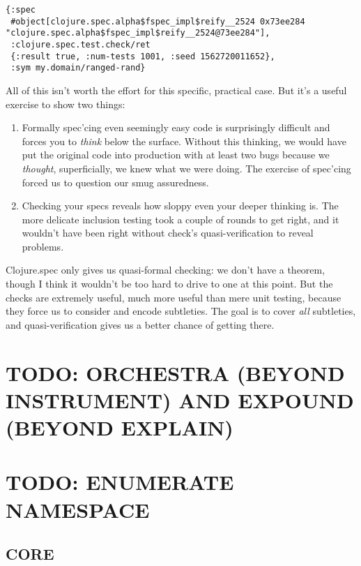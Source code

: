 \documentclass[10pt,oneside,x11names]{article}
\begin{document}
\begin{verbatim}
{:spec
 #object[clojure.spec.alpha$fspec_impl$reify__2524 0x73ee284 "clojure.spec.alpha$fspec_impl$reify__2524@73ee284"],
 :clojure.spec.test.check/ret
 {:result true, :num-tests 1001, :seed 1562720011652},
 :sym my.domain/ranged-rand}
\end{verbatim}


All of this isn't worth the effort for this specific, practical case. But it's a
useful exercise to show two things:

\begin{enumerate}
\item Formally spec'cing even seemingly easy code is surprisingly difficult and
forces you to \emph{think} below the surface. Without this thinking, we would have
put the original code into production with at least two bugs because we
\emph{thought}, superficially, we knew what we were doing. The exercise of
spec'cing forced us to question our smug assuredness.

\item Checking your specs reveals how sloppy even your deeper thinking is. The more
delicate inclusion testing took a couple of rounds to get right, and it
wouldn't have been right without check's quasi-verification to reveal
problems.
\end{enumerate}

Clojure.spec only gives us quasi-formal checking: we don't have a theorem,
though I think it wouldn't be too hard to drive to one at this point. But the
checks are extremely useful, much more useful than mere unit testing, because
they force us to consider and encode subtleties. The goal is to cover \emph{all}
subtleties, and quasi-verification gives us a better chance of getting there.



\section{TODO: ORCHESTRA (BEYOND INSTRUMENT) AND EXPOUND (BEYOND EXPLAIN)}
\label{sec:org502ae96}

\section{TODO: ENUMERATE NAMESPACE}
\label{sec:org6ac072b}
\subsection{CORE}
\label{sec:org1306ea8}
\end{document}
